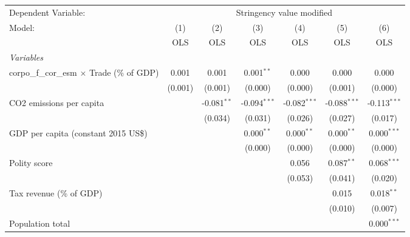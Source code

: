 
\begingroup
\centering
\begin{tabular}{lcccccc}
   \toprule
   Dependent Variable: & \multicolumn{6}{c}{Stringency value modified}\\
   Model:                                             & (1)     & (2)           & (3)            & (4)            & (5)            & (6)\\  
                                                      &  OLS    & OLS           & OLS            & OLS            & OLS            & OLS\\  
   \midrule
   \emph{Variables}\\
   corpo\_f\_cor\_esm $\times$ Trade (\% of GDP)      & 0.001   & 0.001         & 0.001$^{**}$   & 0.000          & 0.000          & 0.000\\   
                                                      & (0.001) & (0.001)       & (0.000)        & (0.000)        & (0.001)        & (0.000)\\   
   CO2 emissions per capita                           &         & -0.081$^{**}$ & -0.094$^{***}$ & -0.082$^{***}$ & -0.088$^{***}$ & -0.113$^{***}$\\   
                                                      &         & (0.034)       & (0.031)        & (0.026)        & (0.027)        & (0.017)\\   
   GDP per capita (constant 2015 US\$)                &         &               & 0.000$^{**}$   & 0.000$^{**}$   & 0.000$^{**}$   & 0.000$^{***}$\\   
                                                      &         &               & (0.000)        & (0.000)        & (0.000)        & (0.000)\\   
   Polity score                                       &         &               &                & 0.056          & 0.087$^{**}$   & 0.068$^{***}$\\   
                                                      &         &               &                & (0.053)        & (0.041)        & (0.020)\\   
   Tax revenue (\% of GDP)                            &         &               &                &                & 0.015          & 0.018$^{**}$\\   
                                                      &         &               &                &                & (0.010)        & (0.007)\\   
   Population total                                   &         &               &                &                &                & 0.000$^{***}$\\   

\end{tabular}
